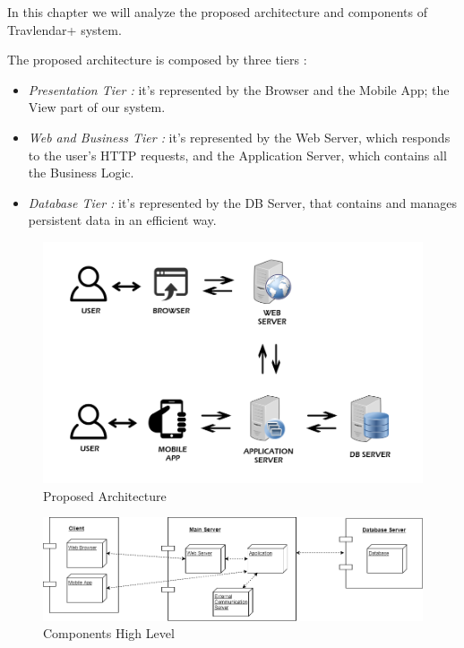\vspace*{-5mm}

In this chapter we will analyze the proposed architecture and components of Travlendar+ system.\par
The proposed architecture is composed by three tiers :
\begin{itemize}
	\setlength{\leftskip}{0.5cm}
	\item \emph{Presentation Tier : }it's represented by the Browser and the Mobile App; the View part of our system.
	\item \emph{Web and Business Tier : }it's represented by the Web Server, which responds to the user's HTTP requests, and the Application Server, which contains all the Business Logic.
	\item \emph{Database Tier : }it's represented by the DB Server, that contains and manages persistent data in an efficient way.
\end{itemize}
\begin{figure}[H]
	\centering
	\includegraphics[scale=0.35]{Images/Architecture/Proposed_Architecture}
	\caption{Proposed Architecture}
\end{figure}

\begin{figure}[H]
	\centering
	\includegraphics[scale=0.35]{Images/Architecture/Components_High_Level}
	\caption{Components High Level}
\end{figure}

